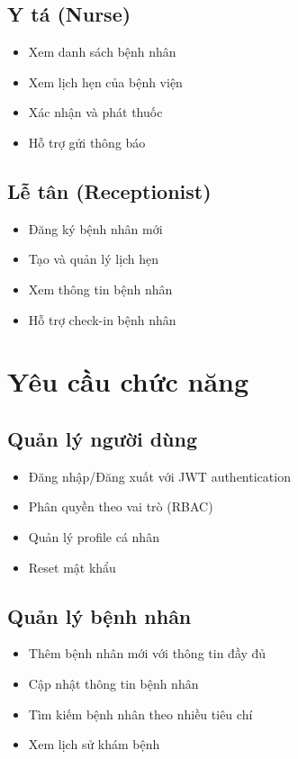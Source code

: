 \documentclass[12pt,a4paper]{report}
\begin{document}
\subsection{Y tá (Nurse)}
\begin{itemize}
    \item Xem danh sách bệnh nhân
    \item Xem lịch hẹn của bệnh viện
    \item Xác nhận và phát thuốc
    \item Hỗ trợ gửi thông báo
\end{itemize}

\subsection{Lễ tân (Receptionist)}
\begin{itemize}
    \item Đăng ký bệnh nhân mới
    \item Tạo và quản lý lịch hẹn
    \item Xem thông tin bệnh nhân
    \item Hỗ trợ check-in bệnh nhân
\end{itemize}

\section{Yêu cầu chức năng}

\subsection{Quản lý người dùng}
\begin{itemize}
    \item Đăng nhập/Đăng xuất với JWT authentication
    \item Phân quyền theo vai trò (RBAC)
    \item Quản lý profile cá nhân
    \item Reset mật khẩu
\end{itemize}

\subsection{Quản lý bệnh nhân}
\begin{itemize}
    \item Thêm bệnh nhân mới với thông tin đầy đủ
    \item Cập nhật thông tin bệnh nhân
    \item Tìm kiếm bệnh nhân theo nhiều tiêu chí
    \item Xem lịch sử khám bệnh
\end{itemize}
\end{document}
